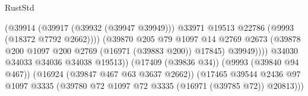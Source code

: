 \begin{lexlean}{RustStd}
\begin{coremodule}
                                                        (@39914
                                                          (@39917 (@39932 (@39947 @39949)))
                                                          @33971
                                                          @19513
                                                          @22786
                                                          (@9993 (@18372 @7792 @2662))))
                                                      (@39870
                                                        @205
                                                        @79
                                                        @1097
                                                        @14
                                                        @2769
                                                        @2673
                                                        (@39878
                                                          @200
                                                          @1097
                                                          @200
                                                          @2769
                                                          (@16971 (@39883 @200))
                                                          @17845)
                                                        @39949))))
                                                @34030
                                                @34033
                                                @34036
                                                @34038
                                                @19513))
                                            (@17409 (@39836 @34))
                                            (@9993 (@39840 @94 @467))
                                            (@16924 (@39847 @467 @63 @3637 @2662))
                                            (@17465
                                              @39544
                                              @2436
                                              @97
                                              @1097
                                              @3335
                                              (@39780
                                                @72
                                                @1097
                                                @72
                                                @3335
                                                (@16971 (@39785 @72))
                                                @20813)))

\end{coremodule}
\end{lexlean}
